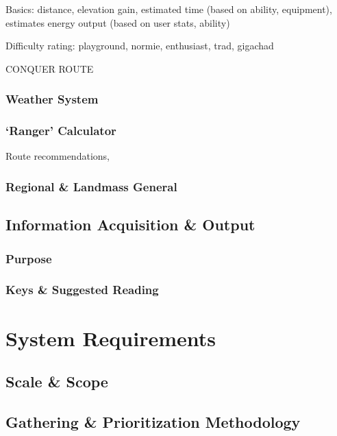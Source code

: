 \documentclass[11pt, english]{article}
\begin{document}
		Basics: distance, elevation gain, estimated time (based on ability, equipment), estimates energy output (based on user stats, ability)

		Difficulty rating: playground, normie, enthusiast, trad, gigachad

		CONQUER ROUTE

		\subsubsection{Weather System}

		\subsubsection{`Ranger' Calculator}

		Route recommendations, 

		\subsubsection{Regional \& Landmass General}

	\subsection{Information Acquisition \& Output}

		\subsubsection{Purpose}

		\subsubsection{Keys \& Suggested Reading}

\newpage

\section{System Requirements}\label{ch4}

	\subsection{Scale \& Scope}

	\subsection{Gathering \& Prioritization Methodology}
\end{document}

